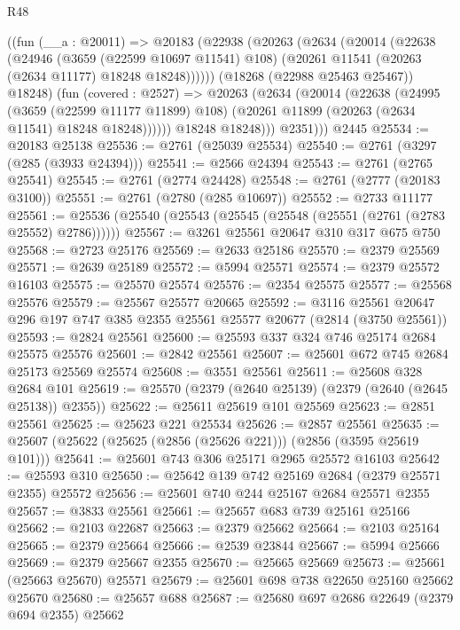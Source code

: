 \begin{lexlean}{R48}
\begin{coremodule}
        ((fun (__a : @20011) =>
        @20183
          (@22938
            (@20263
              (@2634
                (@20014
                  (@22638
                    (@24946
                      (@3659 (@22599 @10697 @11541) @108)
                      (@20261 @11541 (@20263 (@2634 @11177) @18248 @18248))))))
              (@18268 (@22988 @25463 @25467))
              @18248)
            (fun (covered : @2527) =>
            @20263
              (@2634
                (@20014
                  (@22638
                    (@24995
                      (@3659 (@22599 @11177 @11899) @108)
                      (@20261 @11899 (@20263 (@2634 @11541) @18248 @18248))))))
              @18248
              @18248)))
          @2351)))
    @2445
@25534 := @20183 @25138
@25536 := @2761 (@25039 @25534)
@25540 := @2761 (@3297 (@285 (@3933 @24394)))
@25541 := @2566 @24394
@25543 := @2761 (@2765 @25541)
@25545 := @2761 (@2774 @24428)
@25548 := @2761 (@2777 (@20183 @3100))
@25551 := @2761 (@2780 (@285 @10697))
@25552 := @2733 @11177
@25561 := @25536 (@25540 (@25543 (@25545 (@25548 (@25551 (@2761 (@2783 @25552) @2786))))))
@25567 := @3261 @25561 @20647 @310 @317 @675 @750
@25568 := @2723 @25176
@25569 := @2633 @25186
@25570 := @2379 @25569
@25571 := @2639 @25189
@25572 := @5994 @25571
@25574 := @2379 @25572 @16103
@25575 := @25570 @25574
@25576 := @2354 @25575
@25577 := @25568 @25576
@25579 := @25567 @25577 @20665
@25592 := @3116 @25561 @20647 @296 @197 @747 @385 @2355 @25561 @25577 @20677 (@2814 (@3750 @25561))
@25593 := @2824 @25561
@25600 := @25593 @337 @324 @746 @25174 @2684 @25575 @25576
@25601 := @2842 @25561
@25607 := @25601 @672 @745 @2684 @25173 @25569 @25574
@25608 := @3551 @25561
@25611 := @25608 @328 @2684 @101
@25619 := @25570 (@2379 (@2640 @25139) (@2379 (@2640 (@2645 @25138)) @2355))
@25622 := @25611 @25619 @101 @25569
@25623 := @2851 @25561
@25625 := @25623 @221 @25534
@25626 := @2857 @25561
@25635 := @25607 (@25622 (@25625 (@2856 (@25626 @221))) (@2856 (@3595 @25619 @101)))
@25641 := @25601 @743 @306 @25171 @2965 @25572 @16103
@25642 := @25593 @310
@25650 := @25642 @139 @742 @25169 @2684 (@2379 @25571 @2355) @25572
@25656 := @25601 @740 @244 @25167 @2684 @25571 @2355
@25657 := @3833 @25561
@25661 := @25657 @683 @739 @25161 @25166
@25662 := @2103 @22687
@25663 := @2379 @25662
@25664 := @2103 @25164
@25665 := @2379 @25664
@25666 := @2539 @23844
@25667 := @5994 @25666
@25669 := @2379 @25667 @2355
@25670 := @25665 @25669
@25673 := @25661 (@25663 @25670) @25571
@25679 := @25601 @698 @738 @22650 @25160 @25662 @25670
@25680 := @25657 @688
@25687 := @25680 @697 @2686 @22649 (@2379 @694 @2355) @25662

\end{coremodule}
\end{lexlean}

